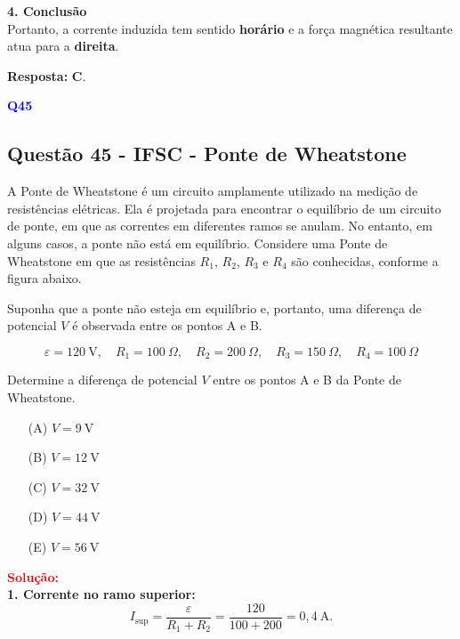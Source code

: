 \begin{flushleft}
\bigskip

\textbf{4. Conclusão}\\
Portanto, a corrente induzida tem sentido \textbf{horário} e a força magnética resultante atua para a \textbf{direita}.

\textbf{Resposta:} \colorbox{green!50}{\textbf{C}}.

\end{flushleft}

\begin{flushleft}
\textbf{\textcolor{blue}{\Large Q45}}\\
\noindent

\subsection{Quest\~ao 45 - IFSC - Ponte de Wheatstone}

A Ponte de Wheatstone é um circuito amplamente utilizado na medição de resistências elétricas. Ela é projetada para encontrar o equilíbrio de um circuito de ponte, em que as correntes em diferentes ramos se anulam. No entanto, em alguns casos, a ponte não está em equilíbrio. Considere uma Ponte de Wheatstone em que as resistências $R_1$, $R_2$, $R_3$ e $R_4$ são conhecidas, conforme a figura abaixo.

Suponha que a ponte não esteja em equilíbrio e, portanto, uma diferença de potencial $V$ é observada entre os pontos A e B.

\[
\varepsilon = 120 \ \text{V}, \quad R_1 = 100 \ \Omega, \quad R_2 = 200 \ \Omega, \quad R_3 = 150 \ \Omega, \quad R_4 = 100 \ \Omega
\]

Determine a diferença de potencial $V$ entre os pontos A e B da Ponte de Wheatstone.

\begin{itemize}
\item[(A)] $V = 9 \ \text{V}$
\item[(B)] $V = 12 \ \text{V}$
\item[(C)] $V = 32 \ \text{V}$
\item[(D)] $V = 44 \ \text{V}$
\item[(E)] $V = 56 \ \text{V}$
\end{itemize}

\vspace{0.5cm}

\textcolor{red}{\textbf{Solução:}}\\

\textbf{1. Corrente no ramo superior:}
\[
I_{\text{sup}} = \frac{\varepsilon}{R_1 + R_2} = \frac{120}{100 + 200} = 0{,}4 \ \text{A}.
\]


\end{flushleft}
